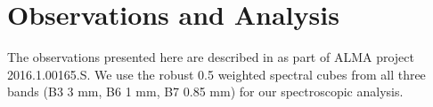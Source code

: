 \documentclass[twocolumn]{aastex62}
\newcommand{\sourcei}{SrcI\xspace}
\newcommand{\bam}[1]{\textcolor{green!65!black}{\textbf{[BAM: #1]}}}
\newcommand{\ag}[1]{\textcolor{red!65!black}{\textbf{[AG: #1]}}}
\begin{document}



\section{Observations and Analysis}



The observations presented here are described in \citet{Ginsburg2018b} as part
of ALMA project 2016.1.00165.S.  We use the robust 0.5 weighted spectral cubes
from all three bands (B3 3 mm, B6 1 mm, B7 0.85 mm) for our spectroscopic analysis.
\end{document}

